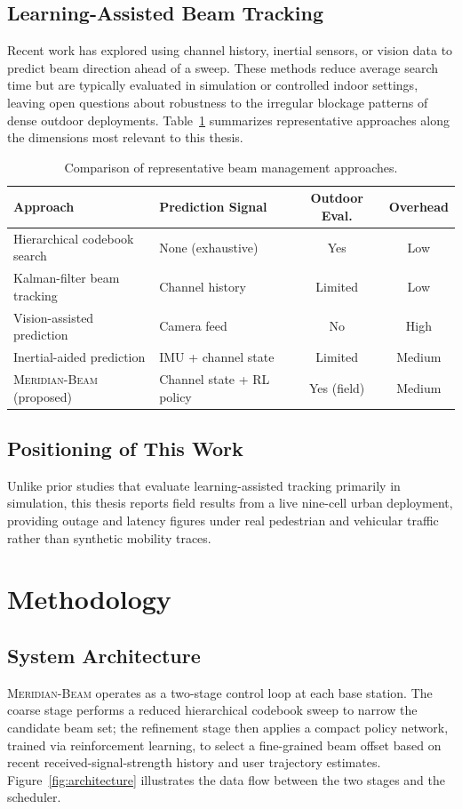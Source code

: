 \documentclass[12pt,a4paper]{report}
\begin{document}
\section{Learning-Assisted Beam Tracking}
Recent work has explored using channel history, inertial sensors, or vision
data to predict beam direction ahead of a sweep. These methods reduce average
search time but are typically evaluated in simulation or controlled indoor
settings, leaving open questions about robustness to the irregular blockage
patterns of dense outdoor deployments. Table~\ref{tab:related} summarizes
representative approaches along the dimensions most relevant to this thesis.

\begin{table}[htbp]
\centering
\caption{Comparison of representative beam management approaches.}
\label{tab:related}
\small
\begin{tabularx}{\textwidth}{@{}lXcc@{}}
\toprule
\textbf{Approach} & \textbf{Prediction Signal} & \textbf{Outdoor Eval.} & \textbf{Overhead} \\
\midrule
Hierarchical codebook search & None (exhaustive) & Yes & Low \\
Kalman-filter beam tracking & Channel history & Limited & Low \\
Vision-assisted prediction & Camera feed & No & High \\
Inertial-aided prediction & IMU + channel state & Limited & Medium \\
\rowcolor{kupale} \textsc{Meridian-Beam} (proposed) & Channel state + RL policy & Yes (field) & Medium \\
\bottomrule
\end{tabularx}
\end{table}

\section{Positioning of This Work}
Unlike prior studies that evaluate learning-assisted tracking primarily in
simulation, this thesis reports field results from a live nine-cell urban
deployment, providing outage and latency figures under real pedestrian and
vehicular traffic rather than synthetic mobility traces.

\chapter{Methodology}
\label{ch:method}

\section{System Architecture}
\textsc{Meridian-Beam} operates as a two-stage control loop at each base
station. The coarse stage performs a reduced hierarchical codebook sweep to
narrow the candidate beam set; the refinement stage then applies a compact
policy network, trained via reinforcement learning, to select a fine-grained
beam offset based on recent received-signal-strength history and user
trajectory estimates. Figure~\ref{fig:architecture} illustrates the data flow
between the two stages and the scheduler.
\end{document}

